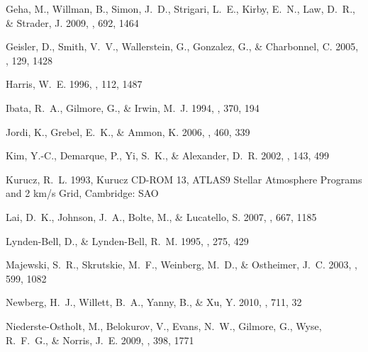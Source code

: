\documentclass{emulateapj}
\begin{document}
\begin{thebibliography}{40}
{Geha}, M., {Willman}, B., {Simon}, J.~D., {Strigari}, L.~E., {Kirby}, E.~N.,
  {Law}, D.~R., \& {Strader}, J. 2009, \apj, 692, 1464

{Geisler}, D., {Smith}, V.~V., {Wallerstein}, G., {Gonzalez}, G., \&
  {Charbonnel}, C. 2005, \aj, 129, 1428

{Harris}, W.~E. 1996, \aj, 112, 1487

{Ibata}, R.~A., {Gilmore}, G., \& {Irwin}, M.~J. 1994, \nat, 370, 194

{Jordi}, K., {Grebel}, E.~K., \& {Ammon}, K. 2006, \aap, 460, 339

{Kim}, Y.-C., {Demarque}, P., {Yi}, S.~K., \& {Alexander}, D.~R. 2002, \apjs,
  143, 499

{Kurucz}, R.~L. 1993, {Kurucz CD-ROM 13, ATLAS9 Stellar Atmosphere Programs and
  2 km/s Grid}, Cambridge: SAO

{Lai}, D.~K., {Johnson}, J.~A., {Bolte}, M., \& {Lucatello}, S. 2007, \apj,
  667, 1185

{Lynden-Bell}, D., \& {Lynden-Bell}, R.~M. 1995, \mnras, 275, 429

{Majewski}, S.~R., {Skrutskie}, M.~F., {Weinberg}, M.~D., \& {Ostheimer}, J.~C.
  2003, \apj, 599, 1082

{Newberg}, H.~J., {Willett}, B.~A., {Yanny}, B., \& {Xu}, Y. 2010, \apj, 711,
  32

{Niederste-Ostholt}, M., {Belokurov}, V., {Evans}, N.~W., {Gilmore}, G.,
  {Wyse}, R.~F.~G., \& {Norris}, J.~E. 2009, \mnras, 398, 1771


\end{thebibliography}
\end{document}
